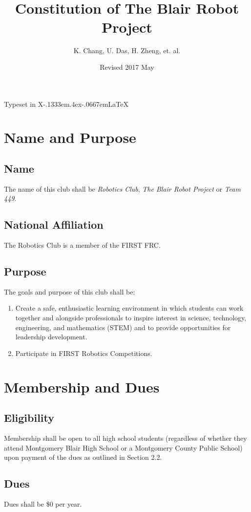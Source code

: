\documentclass[12pt, a4paper]{article}
\title{Constitution of The Blair Robot Project}
\author{K. Chang, U. Das, H. Zheng, et. al.}
\affil{Montgomery Blair High School\\ Silver Spring, Maryland}
\date{Revised 2017 May}
\begin{document}
\maketitle
\thispagestyle{empty}
\begin{center}
Typeset in X\kern-.1333em\lower.4ex\hbox{}\kern-.0667em\LaTeX \hspace{.3em}%
\end{center}
\clearpage
\section{Name and Purpose}
\subsection{Name}
The name of this club shall be \textit{Robotics Club}, \textit{The Blair Robot Project} or \textit{Team 449}.
\subsection{National Affiliation}
The Robotics Club is a member of the FIRST FRC. 
\subsection{Purpose}
The goals and purpose of this club shall be:
\begin{enumerate}
\item Create a safe, enthusiastic learning environment in which students can work together and alongside professionals to inspire interest in science, technology, engineering, and mathematics (STEM) and to provide opportunities for leadership development.
\item Participate in FIRST Robotics Competitions.
\end{enumerate}
\section{Membership and Dues}
\subsection{Eligibility}
Membership shall be open to all high school students (regardless of whether they attend Montgomery Blair High School or a Montgomery County Public School) upon payment of the dues as outlined in Section 2.2.
\subsection{Dues}
Dues shall be \$0 per year.
\end{document}
